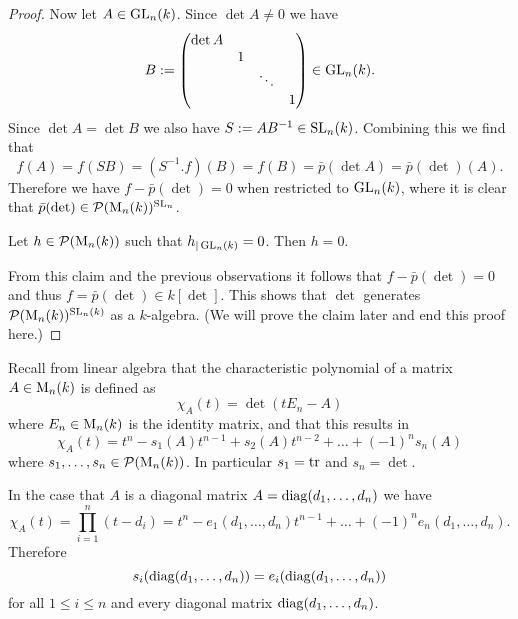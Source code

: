 \begin{proof}
 Now let $A \in \operatorname{GL}_n(k)$. Since $\det A \neq 0$ we have
 \[
  B :=
  \begin{pmatrix}
   \det A &   &        &   \\
          & 1 &        &   \\
          &   & \ddots &   \\
          &   &        & 1 \\
  \end{pmatrix}
  \in \operatorname{GL}_n(k).
 \]
 Since $\det A = \det B$ we also have $S := AB^{-1} \in \operatorname{SL}_n(k)$. Combining this we find that
 \[
  f(A) = f(SB) = \left(S^{-1}.f\right)(B) = f(B) = \bar{p}(\det A) = \bar{p}(\det)(A).
 \]
 Therefore we have $f - \bar{p}(\det) = 0$ when restricted to $\operatorname{GL}_n(k)$, where it is clear that $\bar{p}(\det) \in \mathcal{P}(\operatorname{M}_n(k))^{\operatorname{SL}_n}$.
 
 \begin{claim}
  Let $h \in \mathcal{P}(\operatorname{M}_n(k))$ such that $h_{|\operatorname{GL}_n(k)} = 0$. Then $h = 0$.
 \end{claim}
 
 From this claim and the previous observations it follows that $f - \bar{p}(\det) = 0$ and thus $f = \bar{p}(\det) \in k[\det]$. This shows that $\det$ generates $\mathcal{P}(\operatorname{M}_n(k))^{\operatorname{SL}_n(k)}$ as a $k$-algebra. (We will prove the claim later and end this proof here.)
\end{proof}


Recall from linear algebra that the characteristic polynomial of a matrix $A \in \operatorname{M}_n(k)$ is defined as
\[
 \chi_A(t) = \det(t E_n - A)
\]
where $E_n \in \operatorname{M}_n(k)$ is the identity matrix, and that this results in
\[
 \chi_A(t) = t^n - s_1(A) t^{n-1} + s_2(A) t^{n-2} + \ldots + (-1)^n s_n(A)
\]
where $s_1, \ldots, s_n \in \mathcal{P}(\operatorname{M}_n(k))$. In particular $s_1 = \operatorname{tr}$ and $s_n = \det$.

In the case that $A$ is a diagonal matrix $A = \operatorname{diag}(d_1, \ldots, d_n)$ we have
\[
 \chi_A(t)
 = \prod_{i=1}^n (t-d_i)
 = t^n - e_1(d_1, \ldots, d_n) t^{n-1} + \ldots + (-1)^n e_n(d_1, \ldots, d_n).
\]
Therefore
\[
 s_i(\operatorname{diag}(d_1, \ldots, d_n)) = e_i(\operatorname{diag}(d_1, \ldots, d_n))
\]
for all $1 \leq i \leq n$ and every diagonal matrix $\operatorname{diag}(d_1, \ldots, d_n)$.


